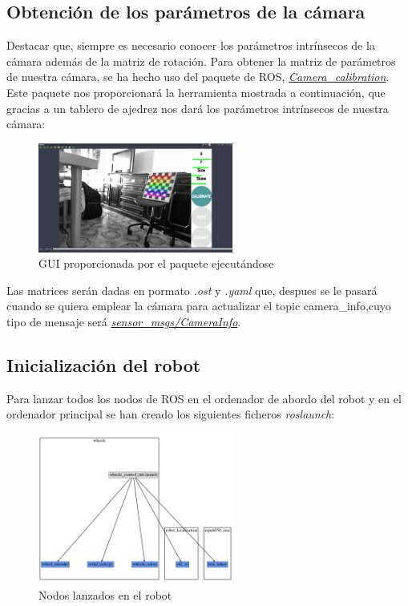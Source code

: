 \subsection{Obtención de los parámetros de la cámara}
Destacar que, siempre es necesario conocer los parámetros intrínsecos de la cámara además de la matriz de rotación. Para obtener la matriz de parámetros de nuestra cámara, se ha hecho uso del paquete de ROS, \textit{\href{http://wiki.ros.org/camera_calibration}{Camera\_calibration}}.\\
Este paquete nos proporcionará la herramienta mostrada a continuación, que gracias a un tablero de ajedrez nos dará los parámetros intrínsecos de nuestra cámara:
\begin{figure}[!ht]
    \centering
    \includegraphics[width=0.57\textwidth]{images/calibration_art}
    \caption{GUI proporcionada por el paquete ejecutándose}
\end{figure}

Las matrices serán dadas en pormato \textit{.ost} y \textit{.yaml} que, despues se le pasará cuando se quiera emplear la cámara para actualizar el topic camera\_info,cuyo 
tipo de mensaje será \textit{\href{http://docs.ros.org/melodic/api/sensor_msgs/html/msg/CameraInfo.html}{sensor\_msgs/CameraInfo}}.
\subsection{Inicialización del robot}
Para lanzar todos los nodos de ROS en el ordenador de abordo del robot y en el ordenador principal se han creado los siguientes ficheros \textit{roslaunch}:
    \begin{figure}[!ht]
        \centering
        \includegraphics[width=0.57\textwidth]{images/whee}
        \caption{Nodos lanzados en el robot}
    \end{figure}

